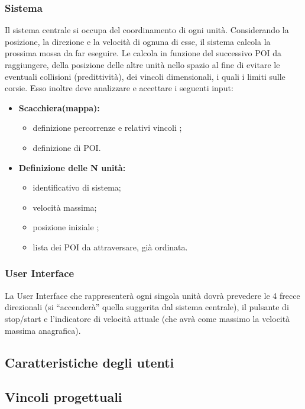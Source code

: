 \subsubsection{Sistema}
Il sistema centrale si occupa del coordinamento di ogni unità. Considerando la posizione, la direzione e la velocità di ognuna di esse, il sistema calcola la prossima mossa da far eseguire. Le calcola in funzione del successivo POI da raggiungere, della posizione delle altre unità nello spazio al fine di evitare le eventuali collisioni (predittività), dei vincoli dimensionali, i quali i limiti sulle corsie. Esso inoltre deve analizzare e accettare i seguenti input:
\begin{itemize}
	\item{\textbf{Scacchiera(mappa):} }
			\begin{itemize}
			\item{definizione percorrenze e relativi vincoli ;}
			\item{definizione di POI.}
			\end{itemize}
	\item{\textbf{Definizione delle N unità:}}
			\begin{itemize}
			\item{identificativo di sistema;} 
			\item{velocità massima; } 
			\item{posizione iniziale ;} 
			\item{lista dei POI da attraversare, già ordinata.}
			\end{itemize}
\end{itemize}

\subsubsection{User Interface} 
La User Interface che rappresenterà ogni singola unità dovrà prevedere le 4 frecce
direzionali (si “accenderà” quella suggerita dal sistema centrale), il pulsante di
stop/start e l’indicatore di velocità attuale (che avrà come massimo la velocità
massima anagrafica).


\subsection{Caratteristiche degli utenti}

\subsection{Vincoli progettuali}